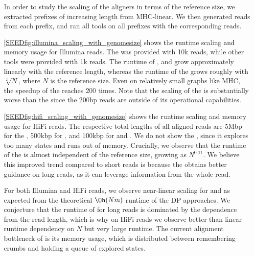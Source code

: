 In order to study the scaling of the aligners in terms of the reference size, we
extracted prefixes of increasing length from MHC-linear. We then generated reads
from each prefix, and ran all tools on all prefixes with the corresponding
reads.

\cref{SEEDfig:illumina_scaling_with_genomesize} shows the runtime scaling and memory
usage for Illumina reads. The \seedh was provided with 10k reads, while other
tools were provided with 1k reads.
%
The runtime of \graphaligner, \pasgal and \vargas grow approximately linearly
with the reference length, whereas the runtime of the \seedh grows roughly with
$\sqrt[2]{N}$, where $N$ is the reference size. Even on relatively small graphs
like MHC, the speedup of the \seedh reaches 200 times. Note that the scaling of
the \prefixh is substantially worse than the \seedh since the 200bp reads are
outside of its operational capabilities.

\cref{SEEDfig:hifi_scaling_with_genomesize} shows the runtime scaling and memory
usage for HiFi reads. The respective total lengths of all aligned reads are 5Mbp
for the \seedh, 500kbp for \graphaligner, and 100kbp for \vargas and \pasgal. We
do not show the \prefixh, since it explores too many states and runs out of
memory.
%
Crucially, we observe that the runtime of the \seedh is almost independent of
the reference size, growing as $N^{0.11}$. We believe this improved trend
compared to short reads is because the \seedh obtains better guidance on long
reads, as it can leverage information from the whole read.

For both Illumina and HiFi reads, we observe near-linear scaling for \pasgal and
\graphaligner as expected from the theoretical $\Oh(Nm)$ runtime of the DP
approaches. We conjecture that the runtime of \vargas for long reads is
dominated by the dependence from the read length, which is why on HiFi reads we
observe better than linear runtime dependency on $N$ but very large runtime. The
current alignment bottleneck of \astarixseeds is its memory usage, which is
distributed between remembering crumbs and holding a queue of explored states.